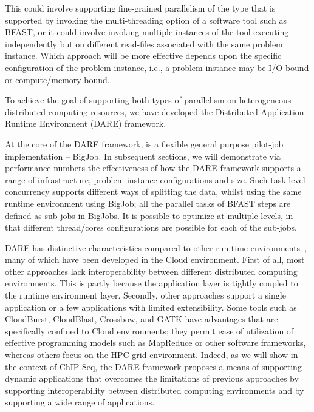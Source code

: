 \documentclass{cpeauth}
\begin{document}
This could involve supporting fine-grained parallelism of the type
that is supported by invoking the multi-threading option of a software
tool such as BFAST, or it could involve invoking multiple instances of
the tool executing independently but on different read-files
associated with the same problem instance. Which approach will be more
effective depends upon the specific configuration of the problem
instance, i.e., a problem instance may be I/O bound or compute/memory
bound.

To achieve the goal of supporting both types of parallelism on
heterogeneous distributed computing resources, we have developed the
Distributed Application Runtime Environment (DARE)
framework\cite{dareurl,dare-tg11,dare-ecmls11}.




At the core of the DARE framework, is a flexible general purpose
pilot-job implementation --
BigJob\cite{saga-ccgrid10,saga-royalsoc,saga-web,jha2009developing,ecmls10}.
In subsequent sections, we will demonstrate via performance numbers
the effectiveness of how the DARE framework supports a range of
infrastructure, problem instance configurations and size.  Such
task-level concurrency supports different ways of splitting the data,
whilst using the same runtime environment using BigJob; all the
parallel tasks of BFAST steps are defined as sub-jobs in BigJobs.  It
is possible to optimize at multiple-levels,  in that different
thread/cores configurations are possible for each of the sub-jobs.

DARE has distinctive characteristics compared to other run-time
environments~\cite{taylor2010,cloudburst, cloudblast,
  langmead2009,langmead2010,gatk,halligan2009,luyf-2010}, many of
which have been developed in the Cloud environment.  First of all,
most other approaches lack interoperability between different
distributed computing environments.  This is partly because the
application layer is tightly coupled to the runtime environment layer.
Secondly, other approaches support a single application or a few
applications with limited extensibility. Some tools such as
CloudBurst\cite{cloudburst}, CloudBlast\cite{cloudblast},
Crossbow\cite{langmead2009}, and GATK\cite{gatk} have advantages that
are specifically confined to Cloud environments; they permit ease of
utilization of effective programming models such as MapReduce or other
software frameworks, whereas others\cite{luyf-2010} focus on the HPC
grid environment.  Indeed, as we will show in the context of ChIP-Seq,
the DARE framework proposes a means of supporting dynamic applications
that overcomes the limitations of previous approaches by supporting
interoperability between distributed computing environments and by
supporting a wide range of applications.
\end{document}
